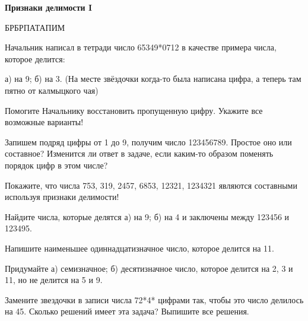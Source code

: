 \centerline{\bf \Huge Признаки делимости I}

\begin{flushright}
        \scriptsize{БРБРПАТАПИМ}
\end{flushright}

 Начальник написал в тетради число 65349*0712 в качестве примера числа, которое делится: 

а) на 9; б) на 3. (На месте звёздочки когда-то была написана цифра, а теперь там пятно от калмыцкого чая)

Помогите Начальнику восстановить пропущенную цифру. Укажите все возможные варианты!

 Запишем подряд цифры от 1 до 9, получим число 123456789. Простое оно или составное? Изменится ли ответ в задаче, если каким-то образом поменять порядок цифр в этом числе?

 Покажите, что числа 753, 319, 2457, 6853, 12321, 1234321 являются составными используя признаки делимости!

 Найдите числа, которые делятся а) на 9; б) на 4 и заключены между 123456 и 123495.

 Напишите наименьшее одиннадцатизначное число, которое делится на 11.

 Придумайте а) семизначное; б) десятизначное число, которое делится на 2, 3 и 11, но не
делится на 5 и 9.

 Замените звездочки в записи числа 72*4* цифрами так, чтобы это число делилось на 45.
Сколько решений имеет эта задача? Выпишите все решения.